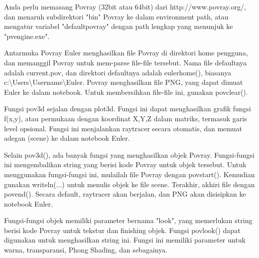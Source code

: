 \documentclass[a4paper,10pt]{article}
\begin{document}
\begin{eulernotebook}
\begin{eulercomment}
Anda perlu memasang Povray (32bit atau 64bit) dari http://www.povray.org/, dan menaruh subdirektori "bin" Povray ke
dalam environment path, atau mengatur variabel "defaultpovray" dengan path lengkap yang menunjuk ke "pvengine.exe".

Antarmuka Povray Euler menghasilkan file Povray di direktori home pengguna, dan memanggil Povray untuk mem-parse
file-file tersebut. Nama file defaultnya adalah current.pov, dan direktori defaultnya adalah eulerhome(), biasanya
c:\textbackslash{}Users\textbackslash{}Username\textbackslash{}Euler. Povray menghasilkan file PNG, yang dapat dimuat Euler ke dalam notebook. Untuk membersihkan
file-file ini, gunakan povclear().

Fungsi pov3d sejalan dengan plot3d. Fungsi ini dapat menghasilkan grafik fungsi f(x,y), atau permukaan dengan
koordinat X,Y,Z dalam matriks, termasuk garis level opsional. Fungsi ini menjalankan raytracer secara otomatis, dan
memuat adegan (scene) ke dalam notebook Euler.

Selain pov3d(), ada banyak fungsi yang menghasilkan objek Povray. Fungsi-fungsi ini mengembalikan string yang berisi
kode Povray untuk objek tersebut. Untuk menggunakan fungsi-fungsi ini, mulailah file Povray dengan povstart().
Kemudian gunakan writeln(...) untuk menulis objek ke file scene. Terakhir, akhiri file dengan povend(). Secara
default, raytracer akan berjalan, dan PNG akan disisipkan ke notebook Euler.

Fungsi-fungsi objek memiliki parameter bernama "look", yang memerlukan string berisi kode Povray untuk tekstur dan
finishing objek. Fungsi povlook() dapat digunakan untuk menghasilkan string ini. Fungsi ini memiliki parameter untuk
warna, transparansi, Phong Shading, dan sebagainya.


\end{eulercomment}
\end{eulernotebook}
\end{document}
